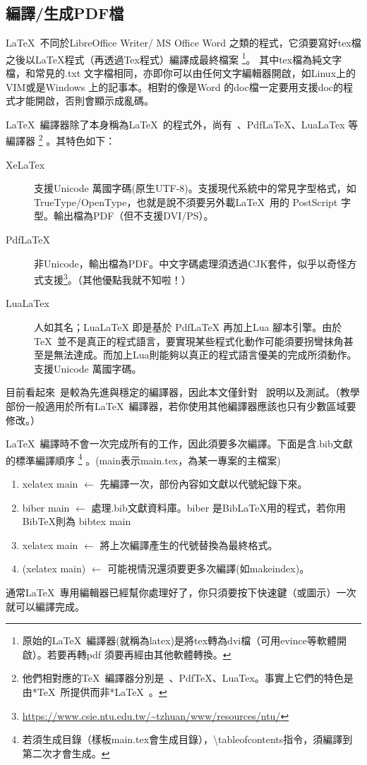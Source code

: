 \documentclass[class=NCU_thesis, crop=false, float=true]{standalone}
\begin{document}
\subsection{編譯/生成PDF檔}
\LaTeX\  不同於LibreOffice Writer/ MS Office Word 之類的程式，它須要寫好tex檔之後以LaTeX程式（再透過Tex程式）編譯成最終檔案
\footnote{原始的\LaTeX\ 編譯器(就稱為latex)是將tex轉為dvi檔（可用evince等軟體開啟）。若要再轉pdf 須要再經由其他軟體轉換。}。%
其中tex檔為純文字檔，和常見的.txt 文字檔相同，亦即你可以由任何文字編輯器開啟，如Linux上的VIM或是Windows 上的記事本。相對的像是Word 的doc檔一定要用支援doc的程式才能開啟，否則會顯示成亂碼。

\LaTeX\  編譯器除了本身稱為\LaTeX\ 的程式外，尚有\XeLaTeX\ 、PdfLaTeX、LuaLaTex 等編譯器
\footnote{他們相對應的\TeX\ 編譯器分別是\XeTeX\ 、PdfTeX、LuaTex。事實上它們的特色是由*\TeX\  所提供而非*\LaTeX\ 。}
。其特色如下：
\begin{description}
    \item[XeLaTex]  支援Unicode 萬國字碼(原生UTF-8)。支援現代系統中的常見字型格式，如TrueType/OpenType，也就是說不須要另外載\LaTeX\  用的 PostScript 字型。輸出檔為PDF（但不支援DVI/PS）。
    \item[PdfLaTeX] 非Unicode，輸出檔為PDF。中文字碼處理須透過CJK套件，似乎以奇怪方式支援\footnote{\url{https://www.csie.ntu.edu.tw/~tzhuan/www/resources/ntu/}}。（其他優點我就不知啦！）
    \item[LuaLaTex] 人如其名；LuaLaTeX 即是基於 PdfLaTeX 再加上Lua 腳本引擎。由於 \TeX\  並不是真正的程式語言，要實現某些程式化動作可能須要拐彎抹角甚至是無法達成。而加上Lua則能夠以真正的程式語言優美的完成所須動作。支援Unicode 萬國字碼。
\end{description}
目前看起來\XeLaTeX\ 是較為先進與穩定的編譯器，因此本文僅針對 \XeLaTeX\  說明以及測試。（教學部份一般適用於所有\LaTeX\  編譯器，若你使用其他編譯器應該也只有少數區域要修改。）

\LaTeX\ 編譯時不會一次完成所有的工作，因此須要多次編譯。下面是含.bib文獻的標準編譯順序
\footnote{若須生成目錄（樣板main.tex會生成目錄），\textbackslash{}tableofcontents指令，須編譯到第二次才會生成。}
。(main表示main.tex，為某一專案的主檔案)
\begin{enumerate}
	\item xelatex main   $\longleftarrow$ 先編譯一次，部份內容如文獻以代號紀錄下來。
	\item biber main     $\longleftarrow$ 處理.bib文獻資料庫。biber 是BibLaTeX用的程式，若你用BibTeX則為 bibtex main
	\item xelatex main   $\longleftarrow$ 將上次編譯產生的代號替換為最終格式。
	\item (xelatex main) $\longleftarrow$ 可能視情況還須要更多次編譯(如makeindex)。
\end{enumerate}
通常\LaTeX\ 專用編輯器已經幫你處理好了，你只須要按下快速鍵（或圖示）一次就可以編譯完成。
\end{document}
